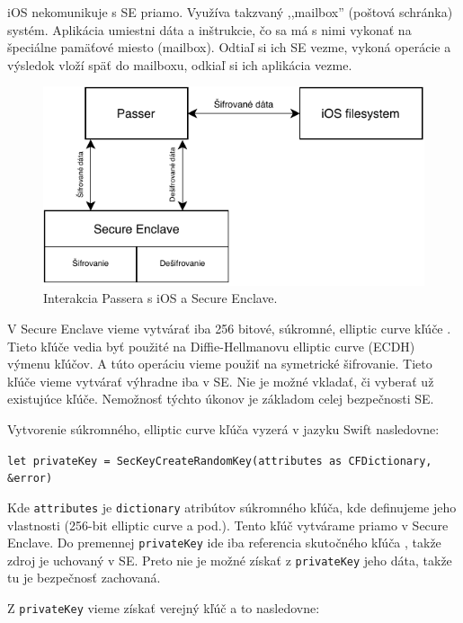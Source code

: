 iOS nekomunikuje s SE priamo. Využíva takzvaný ,,mailbox'' (poštová schránka) systém. Aplikácia umiestni dáta a inštrukcie, čo sa má s nimi vykonať na špeciálne pamäťové miesto (mailbox). Odtiaľ si ich SE vezme, vykoná operácie a výsledok vloží späť do mailboxu, odkiaľ si ich aplikácia vezme. 
\newline
\begin{figure}[H]
  \centering
  \includegraphics[width=15cm]{img/enclave.pdf}
  \caption{Interakcia Passera s iOS a Secure Enclave.}
  \label{enclave}
\end{figure}

V Secure Enclave vieme vytvárať iba 256 bitové, súkromné, elliptic curve kľúče \cite{secureenclave_appledoc}. Tieto kľúče vedia byť použité na Diffie-Hellmanovu elliptic curve (ECDH) výmenu kľúčov. A túto operáciu vieme použiť na symetrické šifrovanie. Tieto kľúče vieme vytvárať výhradne iba v SE. Nie je možné vkladať, či vyberať už existujúce kľúče. Nemožnosť týchto úkonov je základom celej bezpečnosti SE. 

Vytvorenie súkromného, elliptic curve kľúča vyzerá v jazyku Swift nasledovne:

\begin{center}
    \texttt{let privateKey = SecKeyCreateRandomKey(attributes as CFDictionary, \&error)}
\end{center}

\noindent Kde \texttt{attributes} je \texttt{dictionary} atribútov súkromného kľúča, kde definujeme jeho vlastnosti (256-bit elliptic curve a pod.). Tento kľúč vytvárame priamo v Secure Enclave. Do premennej \texttt{privateKey} ide iba referencia skutočného kľúča \cite{secureenclave_appledoc}, takže zdroj je uchovaný v SE. Preto nie je možné získať z \texttt{privateKey} jeho dáta, takže tu je bezpečnosť zachovaná. 

Z \texttt{privateKey} vieme získať verejný kľúč a to nasledovne: 

